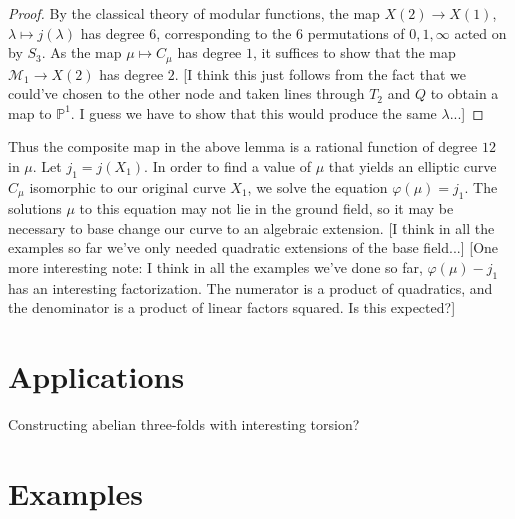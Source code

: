 \documentclass[reqno, 12pt]{amsart}
\theoremstyle{definition}
\renewcommand{\P}{\mathbb P}
\newcommand{\sss}[1]{{\color{blue} [#1]}}
\begin{document}
\begin{proof}
By the classical theory of modular functions, the map $X(2) \to X(1)$, $\lambda \mapsto j(\lambda)$ has degree $6$, corresponding to the $6$ permutations of $0, 1, \infty$ acted on by $S_3$. As the map $\mu \mapsto C_\mu$ has degree $1$, it suffices to show that the map $\mathcal{M}_1 \to X(2)$ has degree $2$. \sss{I think this just follows from the fact that we could've chosen to the other node and taken lines through $T_2$ and $Q$ to obtain a map to $\P^1$. I guess we have to show that this would produce the same $\lambda$...}
\end{proof}

Thus the composite map in the above lemma is a rational function of degree $12$ in $\mu$. Let $j_1 = j(X_1)$. In order to find a value of $\mu$ that yields an elliptic curve $C_\mu$ isomorphic to our original curve $X_1$, we solve the equation $\varphi(\mu) = j_1$. The solutions $\mu$ to this equation may not lie in the ground field, so it may be necessary to base change our curve to an algebraic extension. \sss{I think in all the examples so far we've only needed quadratic extensions of the base field...} \sss{One more interesting note: I think in all the examples we've done so far, $\varphi(\mu) - j_1$ has an interesting factorization. The numerator is a product of quadratics, and the denominator is a product of linear factors squared. Is this expected?}

\section{Applications}
Constructing abelian three-folds with interesting torsion?

\section{Examples}

%


\end{document}
